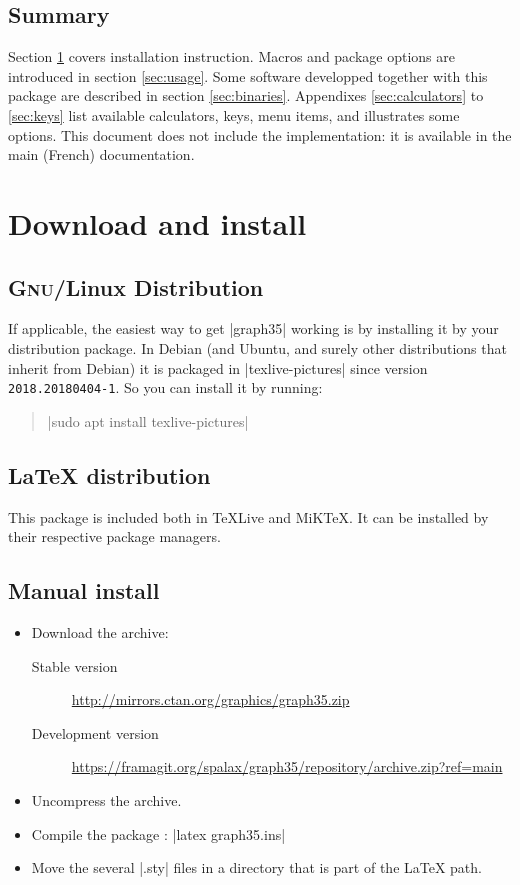 \documentclass{ltxdoc}
\begin{document}
 \subsection{Summary}

 Section \ref{sec:install} covers installation instruction. Macros and package options are introduced in section \ref{sec:usage}. Some software developped together with this package are described in section \ref{sec:binaries}. Appendixes \ref{sec:calculators} to \ref{sec:keys} list available calculators, keys, menu items, and illustrates some options. This document does not include the implementation: it is available in the main (French) documentation.

 \section{Download and install}
 \label{sec:install}

 \subsection{\textsc{Gnu}/Linux Distribution}

 If applicable, the easiest way to get |graph35| working is by installing it by your distribution package. In Debian (and Ubuntu, and surely other distributions that inherit from Debian) it is packaged in |texlive-pictures| since version \texttt{2018.20180404-1}. So you can install it by running:

 \begin{quote}
 |sudo apt install texlive-pictures|
 \end{quote}

 \subsection{\LaTeX{} distribution}

 This package is included both in \TeX{}Live and MiK\TeX{}. It can be installed by their respective package managers.

 \subsection{Manual install}

 \begin{itemize}
 \item Download the archive:
 \begin{description}
 \item[Stable version] \url{http://mirrors.ctan.org/graphics/graph35.zip}
 \item[Development version] \url{https://framagit.org/spalax/graph35/repository/archive.zip?ref=main}
 \end{description}
 \item Uncompress the archive.
 \item Compile the package : |latex graph35.ins|
 \item Move the several |.sty| files in a directory that is part of the \LaTeX{} path.
 \end{itemize}
\end{document}
